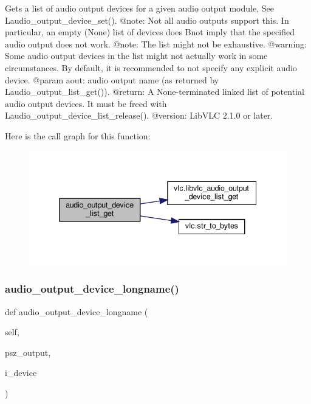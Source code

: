 \begin{DoxyVerb}Gets a list of audio output devices for a given audio output module,
See L{audio_output_device_set}().
@note: Not all audio outputs support this. In particular, an empty (None)
list of devices does B{not} imply that the specified audio output does
not work.
@note: The list might not be exhaustive.
@warning: Some audio output devices in the list might not actually work in
some circumstances. By default, it is recommended to not specify any
explicit audio device.
@param aout: audio output name (as returned by L{audio_output_list_get}()).
@return: A None-terminated linked list of potential audio output devices. It must be freed with L{audio_output_device_list_release}().
@version: LibVLC 2.1.0 or later.
\end{DoxyVerb}
 Here is the call graph for this function\+:
\nopagebreak
\begin{figure}[H]
\begin{center}
\leavevmode
\includegraphics[width=338pt]{classvlc_1_1_instance_ac5b57b31bfaf677dfd90ae3bc2c770e5_cgraph}
\end{center}
\end{figure}
\mbox{\label{classvlc_1_1_instance_adb695b24e932f78c36dcca72806974e9}} 
\subsubsection{\texorpdfstring{audio\+\_\+output\+\_\+device\+\_\+longname()}{audio\_output\_device\_longname()}}
{\footnotesize\ttfamily def audio\+\_\+output\+\_\+device\+\_\+longname (\begin{DoxyParamCaption}\item[{}]{self,  }\item[{}]{psz\+\_\+output,  }\item[{}]{i\+\_\+device }\end{DoxyParamCaption})}

